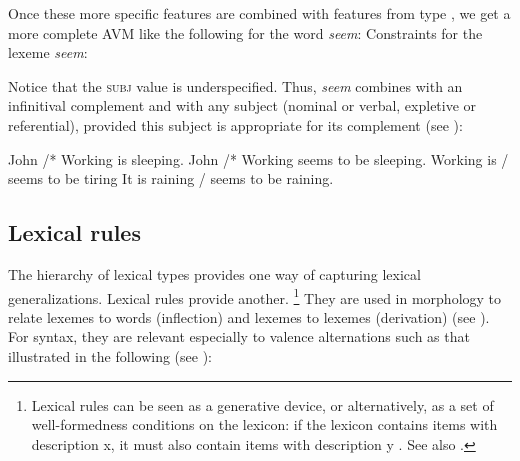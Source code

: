 \documentclass[output=paper
	        ,collection
	        ,collectionchapter
 	        ,biblatex
                ,babelshorthands
                ,newtxmath
                ,draftmode
                ,colorlinks, citecolor=brown
]{langscibook}
\begin{document}
Once these more specific features are combined with features from type , we get a more complete AVM like the following for the word \emph{seem}:
\ea\label{ex:prop24}
Constraints for the lexeme \emph{seem}:\\
\z

Notice that the \textsc{subj} value is underspecified. Thus, \emph{seem} combines with an infinitival complement and with any subject (nominal or verbal, expletive or referential), provided this subject is appropriate for its complement (see ):

\eal\label{ex:prop25}
\ex John /* Working is sleeping.
\ex John /* Working seems to be sleeping.
\ex Working is / seems to be tiring
\ex It is raining / seems to be raining.
\zl

\subsection{Lexical rules}\label{sec:prop4.2}
\label{prop:sec-lex-rules}

The hierarchy of lexical types provides one way of capturing lexical generalizations. Lexical rules provide another.%
%
\footnote{Lexical rules can be seen as a generative device, or alternatively, as a set of
  well-formedness conditions on the lexicon: if the lexicon contains items with description x, it
  must also contain items with description y \citep{Meurers2001a}. See also .}
%
They are used in morphology to relate lexemes to words (inflection) and lexemes to lexemes (derivation) (see \addpages). For syntax, they are relevant especially to valence alternations such as that illustrated in the following (see \addpages):
\end{document}
